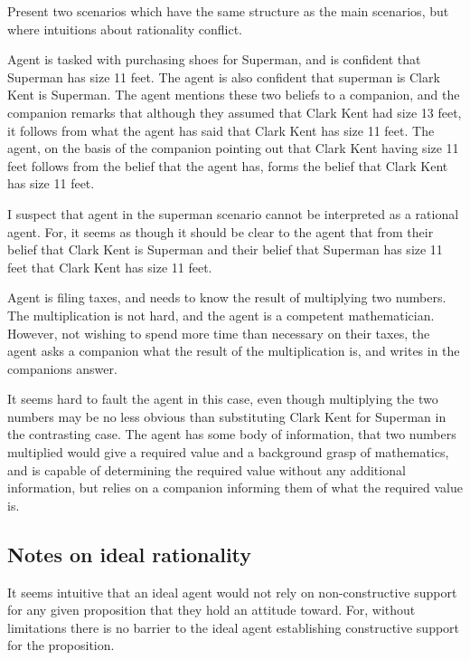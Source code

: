 \documentclass[10pt]{article}
\begin{document}
Present two scenarios which have the same structure as the main scenarios, but where intuitions about rationality conflict.

\begin{scenario}[Superman]
  Agent is tasked with purchasing shoes for Superman, and is confident that Superman has size 11 feet.
  The agent is also confident that superman is Clark Kent is Superman.
  The agent mentions these two beliefs to a companion, and the companion remarks that although they assumed that Clark Kent had size 13 feet, it follows from what the agent has said that Clark Kent has size 11 feet.
  The agent, on the basis of the companion pointing out that Clark Kent having size 11 feet follows from the belief that the agent has, forms the belief that Clark Kent has size 11 feet.
\end{scenario}

I suspect that agent in the superman scenario cannot be interpreted as a rational agent.
For, it seems as though it should be clear to the agent that from their belief that Clark Kent is Superman and their belief that Superman has size 11 feet that Clark Kent has size 11 feet.

\begin{scenario}[Calculator]
  Agent is filing taxes, and needs to know the result of multiplying two numbers.
  The multiplication is not hard, and the agent is a competent mathematician.
  However, not wishing to spend more time than necessary on their taxes, the agent asks a companion what the result of the multiplication is, and writes in the companions answer.
\end{scenario}

It seems hard to fault the agent in this case, even though multiplying the two numbers may be no less obvious than substituting Clark Kent for Superman in the contrasting case.
The agent has some body of information, that two numbers multiplied would give a required value and a background grasp of mathematics, and is capable of determining the required value without any additional information, but relies on a companion informing them of what the required value is.

\subsection{Notes on ideal rationality}
\label{sec:notes-ideal-rati}

It seems intuitive that an ideal agent would not rely on non-constructive support for any given proposition that they hold an attitude toward.
For, without limitations there is no barrier to the ideal agent establishing constructive support for the proposition.
\end{document}
